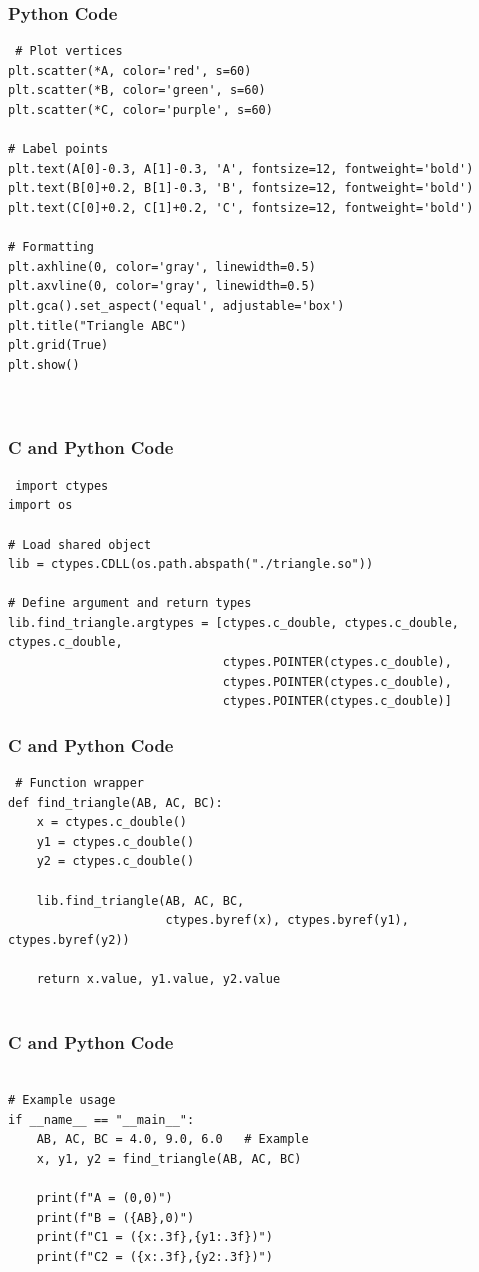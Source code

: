 \documentclass{beamer}
\begin{document}
\begin{frame}[fragile]
    \frametitle{Python Code}
    \begin{lstlisting}
 # Plot vertices
plt.scatter(*A, color='red', s=60)
plt.scatter(*B, color='green', s=60)
plt.scatter(*C, color='purple', s=60)

# Label points
plt.text(A[0]-0.3, A[1]-0.3, 'A', fontsize=12, fontweight='bold')
plt.text(B[0]+0.2, B[1]-0.3, 'B', fontsize=12, fontweight='bold')
plt.text(C[0]+0.2, C[1]+0.2, 'C', fontsize=12, fontweight='bold')

# Formatting
plt.axhline(0, color='gray', linewidth=0.5)
plt.axvline(0, color='gray', linewidth=0.5)
plt.gca().set_aspect('equal', adjustable='box')
plt.title("Triangle ABC")
plt.grid(True)
plt.show()



    \end{lstlisting}
\end{frame}
\begin{frame}[fragile]
    \frametitle{C and Python Code}
    \begin{lstlisting}
 import ctypes
import os

# Load shared object
lib = ctypes.CDLL(os.path.abspath("./triangle.so"))

# Define argument and return types
lib.find_triangle.argtypes = [ctypes.c_double, ctypes.c_double, ctypes.c_double,
                              ctypes.POINTER(ctypes.c_double),
                              ctypes.POINTER(ctypes.c_double),
                              ctypes.POINTER(ctypes.c_double)]

    \end{lstlisting}
\end{frame}
 \begin{frame}[fragile]
    \frametitle{C and Python Code}
    \begin{lstlisting}
 # Function wrapper
def find_triangle(AB, AC, BC):
    x = ctypes.c_double()
    y1 = ctypes.c_double()
    y2 = ctypes.c_double()
    
    lib.find_triangle(AB, AC, BC,
                      ctypes.byref(x), ctypes.byref(y1), ctypes.byref(y2))
    
    return x.value, y1.value, y2.value


    \end{lstlisting}
\end{frame}
 \begin{frame}[fragile]
    \frametitle{C and Python Code}
    \begin{lstlisting}
 
# Example usage
if __name__ == "__main__":
    AB, AC, BC = 4.0, 9.0, 6.0   # Example
    x, y1, y2 = find_triangle(AB, AC, BC)
    
    print(f"A = (0,0)")
    print(f"B = ({AB},0)")
    print(f"C1 = ({x:.3f},{y1:.3f})")
    print(f"C2 = ({x:.3f},{y2:.3f})")


    \end{lstlisting}
\end{frame}
  
\end{document}
